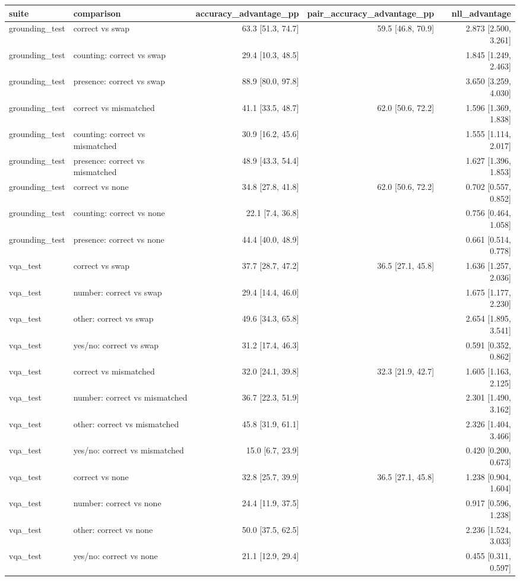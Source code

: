 \begin{tabular}{llrrr}
\toprule
suite & comparison & accuracy\_advantage\_pp & pair\_accuracy\_advantage\_pp & nll\_advantage \\
\midrule
grounding\_test & correct vs swap & 63.3 [51.3, 74.7] & 59.5 [46.8, 70.9] & 2.873 [2.500, 3.261] \\
grounding\_test &   counting: correct vs swap & 29.4 [10.3, 48.5] &  & 1.845 [1.249, 2.463] \\
grounding\_test &   presence: correct vs swap & 88.9 [80.0, 97.8] &  & 3.650 [3.259, 4.030] \\
grounding\_test & correct vs mismatched & 41.1 [33.5, 48.7] & 62.0 [50.6, 72.2] & 1.596 [1.369, 1.838] \\
grounding\_test &   counting: correct vs mismatched & 30.9 [16.2, 45.6] &  & 1.555 [1.114, 2.017] \\
grounding\_test &   presence: correct vs mismatched & 48.9 [43.3, 54.4] &  & 1.627 [1.396, 1.853] \\
grounding\_test & correct vs none & 34.8 [27.8, 41.8] & 62.0 [50.6, 72.2] & 0.702 [0.557, 0.852] \\
grounding\_test &   counting: correct vs none & 22.1 [7.4, 36.8] &  & 0.756 [0.464, 1.058] \\
grounding\_test &   presence: correct vs none & 44.4 [40.0, 48.9] &  & 0.661 [0.514, 0.778] \\
vqa\_test & correct vs swap & 37.7 [28.7, 47.2] & 36.5 [27.1, 45.8] & 1.636 [1.257, 2.036] \\
vqa\_test &   number: correct vs swap & 29.4 [14.4, 46.0] &  & 1.675 [1.177, 2.230] \\
vqa\_test &   other: correct vs swap & 49.6 [34.3, 65.8] &  & 2.654 [1.895, 3.541] \\
vqa\_test &   yes/no: correct vs swap & 31.2 [17.4, 46.3] &  & 0.591 [0.352, 0.862] \\
vqa\_test & correct vs mismatched & 32.0 [24.1, 39.8] & 32.3 [21.9, 42.7] & 1.605 [1.163, 2.125] \\
vqa\_test &   number: correct vs mismatched & 36.7 [22.3, 51.9] &  & 2.301 [1.490, 3.162] \\
vqa\_test &   other: correct vs mismatched & 45.8 [31.9, 61.1] &  & 2.326 [1.404, 3.466] \\
vqa\_test &   yes/no: correct vs mismatched & 15.0 [6.7, 23.9] &  & 0.420 [0.200, 0.673] \\
vqa\_test & correct vs none & 32.8 [25.7, 39.9] & 36.5 [27.1, 45.8] & 1.238 [0.904, 1.604] \\
vqa\_test &   number: correct vs none & 24.4 [11.9, 37.5] &  & 0.917 [0.596, 1.238] \\
vqa\_test &   other: correct vs none & 50.0 [37.5, 62.5] &  & 2.236 [1.524, 3.033] \\
vqa\_test &   yes/no: correct vs none & 21.1 [12.9, 29.4] &  & 0.455 [0.311, 0.597] \\
\bottomrule
\end{tabular}
